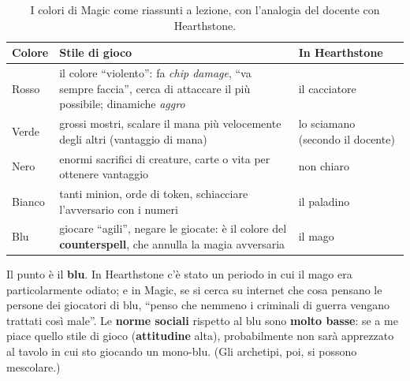 \begin{table}[htbp]
  \centering
  \caption{I colori di Magic come riassunti a lezione, con l'analogia del
  docente con Hearthstone.}
  \label{gd9:tab:magic}
  \small
  \begin{tabular}{@{}p{}p{}p{}@{}}
    \toprule
    \textbf{Colore} & \textbf{Stile di gioco} & \textbf{In Hearthstone} \\
    \midrule
    Rosso & il colore ``violento'': fa \emph{chip damage}, ``va sempre
            faccia'', cerca di attaccare il più possibile; dinamiche
            \emph{aggro} & il cacciatore \\
    \addlinespace
    Verde & grossi mostri, scalare il mana più velocemente degli altri
            (vantaggio di mana) & lo sciamano (secondo il docente) \\
    \addlinespace
    Nero  & enormi sacrifici di creature, carte o vita per ottenere
            vantaggio & non chiaro\footnotemark \\
    \addlinespace
    Bianco & tanti minion, orde di token, schiacciare l'avversario con i
             numeri & il paladino \\
    \addlinespace
    Blu   & giocare ``agili'', negare le giocate: è il colore del
            \textbf{counterspell}, che annulla la magia avversaria & il mago \\
    \bottomrule
  \end{tabular}
\end{table}

Il punto è il \textbf{blu}. In Hearthstone c'è stato un periodo in cui il mago
era particolarmente odiato; e in Magic, se si cerca su internet che cosa
pensano le persone dei giocatori di blu, ``penso che nemmeno i criminali di
guerra vengano trattati così male''. Le \textbf{norme sociali} rispetto al blu
sono \textbf{molto basse}: se a me piace quello stile di gioco
(\textbf{attitudine} alta), probabilmente non sarà apprezzato al tavolo in
cui sto giocando un mono-blu. (Gli archetipi, poi, si possono mescolare.)

